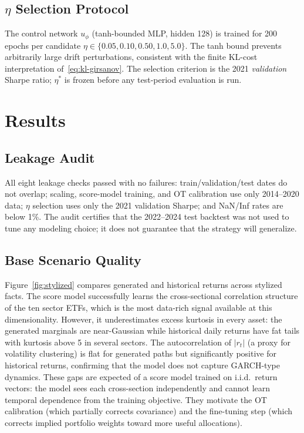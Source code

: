 \documentclass{article}
\begin{document}
\subsection{\texorpdfstring{$\eta$}{eta} Selection Protocol}

The control network $u_\phi$ (tanh-bounded MLP, hidden 128) is trained for 200
epochs per candidate $\eta \in \{0.05, 0.10, 0.50, 1.0, 5.0\}$. The tanh bound
prevents arbitrarily large drift perturbations, consistent with the finite KL-cost
interpretation of~\eqref{eq:kl-girsanov}. The selection criterion is the 2021
\emph{validation} Sharpe ratio; $\eta^*$ is frozen before any test-period
evaluation is run.

\section{Results}
\label{sec:results}

\subsection{Leakage Audit}

All eight leakage checks passed with no failures: train/validation/test dates do
not overlap; scaling, score-model training, and OT calibration use only 2014--2020
data; $\eta$ selection uses only the 2021 validation Sharpe; and NaN/Inf rates are
below 1\%. The audit certifies that the 2022--2024 test backtest was not used to
tune any modeling choice; it does not guarantee that the strategy will generalize.

\subsection{Base Scenario Quality}

Figure~\ref{fig:stylized} compares generated and historical returns across stylized
facts. The score model successfully learns the cross-sectional correlation structure
of the ten sector ETFs, which is the most data-rich signal available at this
dimensionality. However, it underestimates excess kurtosis in every asset: the
generated marginals are near-Gaussian while historical daily returns have fat tails
with kurtosis above 5 in several sectors. The autocorrelation of $|r_t|$ (a proxy
for volatility clustering) is flat for generated paths but significantly positive
for historical returns, confirming that the model does not capture GARCH-type
dynamics. These gaps are expected of a score model trained on i.i.d.\ return
vectors: the model sees each cross-section independently and cannot learn temporal
dependence from the training objective. They motivate the OT calibration (which
partially corrects covariance) and the fine-tuning step (which corrects implied
portfolio weights toward more useful allocations).
\end{document}
